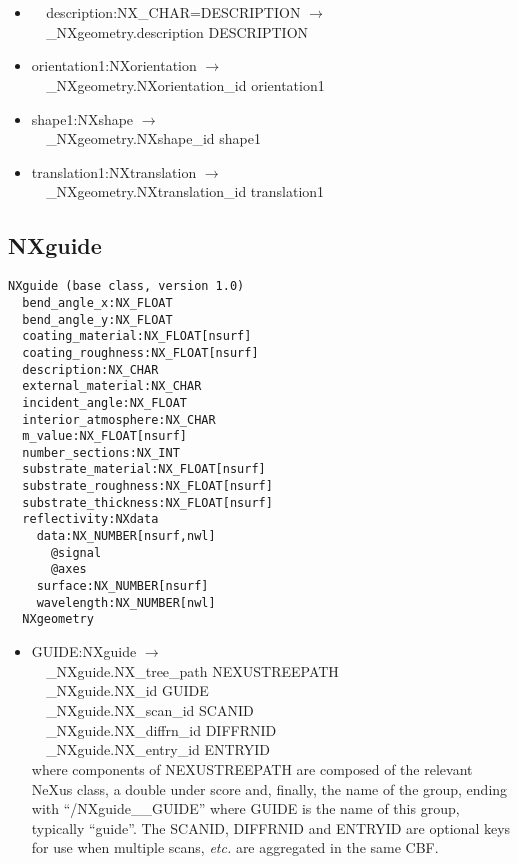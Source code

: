 \documentclass[11pt]{article}
\begin{document}
{{\begin{itemize}
\item{\verb|  |description:NX\_CHAR=DESCRIPTION $\rightarrow$\\
\verb|  |\_NXgeometry.description DESCRIPTION}

\item{orientation1:NXorientation $\rightarrow$\\
\verb|  |\_NXgeometry.NXorientation\_id orientation1}

\item{shape1:NXshape $\rightarrow$\\
\verb|  |\_NXgeometry.NXshape\_id shape1}

\item{translation1:NXtranslation $\rightarrow$\\
\verb|  |\_NXgeometry.NXtranslation\_id translation1}
\end{itemize}
\subsection{NXguide}

\begin{verbatim}
NXguide (base class, version 1.0)
  bend_angle_x:NX_FLOAT
  bend_angle_y:NX_FLOAT
  coating_material:NX_FLOAT[nsurf]
  coating_roughness:NX_FLOAT[nsurf]
  description:NX_CHAR
  external_material:NX_CHAR
  incident_angle:NX_FLOAT
  interior_atmosphere:NX_CHAR
  m_value:NX_FLOAT[nsurf]
  number_sections:NX_INT
  substrate_material:NX_FLOAT[nsurf]
  substrate_roughness:NX_FLOAT[nsurf]
  substrate_thickness:NX_FLOAT[nsurf]
  reflectivity:NXdata
    data:NX_NUMBER[nsurf,nwl]
      @signal
      @axes
    surface:NX_NUMBER[nsurf]
    wavelength:NX_NUMBER[nwl]
  NXgeometry
\end{verbatim}

\begin{itemize}

\item{GUIDE:NXguide $\rightarrow$\\
\verb|  |\_NXguide.NX\_tree\_path    NEXUSTREEPATH \\
\verb|  |\_NXguide.NX\_id            GUIDE\\
\verb|  |\_NXguide.NX\_scan\_id      SCANID \\
\verb|  |\_NXguide.NX\_diffrn\_id    DIFFRNID \\
\verb|  |\_NXguide.NX\_entry\_id     ENTRYID \\
where components of NEXUSTREEPATH are composed of the
relevant NeXus class, a double under score and, finally, the
name of the group, ending with ``/NXguide\_\_GUIDE''
where GUIDE is the name of this group, typically ``guide''.
The SCANID, DIFFRNID and ENTRYID are optional keys for use
when multiple scans, {\it etc.} are aggregated in the same CBF.}


\end{itemize}}}
\end{document}
